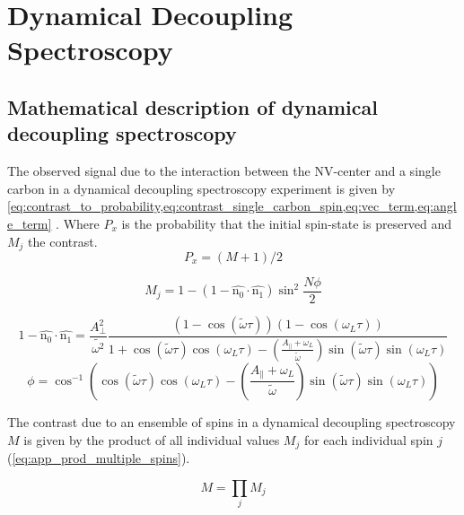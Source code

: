 \chapter{Dynamical Decoupling Spectroscopy}

\section{Mathematical description of dynamical decoupling spectroscopy}
\label{sec:mathematical_description_dd_spectro}


The observed signal due to the interaction between the NV-center and a single carbon in a dynamical decoupling spectroscopy experiment is given by \cref{eq:contrast_to_probability,eq:contrast_single_carbon_spin,eq:vec_term,eq:angle_term} \citep{Taminiau2012Detection}. Where $P_x$ is the probability that the initial spin-state is preserved and $M_j$ the contrast.
\begin{equation}
\label{eq:contrast_to_probability}
P_x = (M+1)/2
\end{equation}

\begin{equation}
\label{eq:contrast_single_carbon_spin}
M_j = 1-(1 - \hat{\bm{\mathrm{n_0}}} \cdot \hat{\bm{\mathrm{n_1}}}) \sin^2 \frac{N\phi}{2}
\end{equation}

\begin{equation}
\label{eq:vec_term}
    1 - \hat{\bm{\mathrm{n_0}}} \cdot \hat{\bm{\mathrm{n_1}}} =  \frac{A_\perp ^2}{\tilde{\omega^2}} \frac{(1- \cos{(\tilde{\omega} \tau)})(1-\cos{(\omega_L \tau)})} {1 +\cos{(\tilde{\omega} \tau)}\cos{(\omega_L \tau)} - (\frac{ A_ \parallel + \omega_L }{ \tilde{ \omega}}) \sin{(\tilde{\omega} \tau)}\sin{(\omega_L \tau)}}
\end{equation}
\begin{equation}
\label{eq:angle_term}
    \phi =  \cos^{-1}\left(\cos(\tilde{\omega} \tau) \cos(\omega_L \tau)-\left(\frac{ A_ \parallel + \omega_L }{ \tilde{ \omega}}\right) \sin(\tilde{\omega} \tau)\sin(\omega_L \tau)\right)
\end{equation}

The contrast due to an ensemble of spins in a dynamical decoupling spectroscopy$M$ is given by the product of all individual values $M_j$ for each individual spin $j$ (\cref{eq:app_prod_multiple_spins}).

\begin{equation}
    M = \prod_{j}{M_j}
    \label{eq:app_prod_multiple_spins}
\end{equation}


